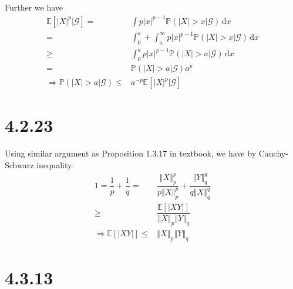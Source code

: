 \documentclass[11pt,a4paper]{ctexart}
\numberwithin{equation}{section}%
\begin{document}
\subsection{}
Further we have
\begin{align*}
    \mathbb{E}\left[ \left\vert X \right\vert ^p | \mathcal{G} \right]  =&\int p\left\vert x \right\vert ^{p-1} \mathbb{P}\left( \left\vert X \right\vert >x|\mathcal{G} \right) \,\mathrm{d}x\\
    =& \int_0^a +\int_a^\infty p\left\vert x \right\vert ^{p-1} \mathbb{P}\left( \left\vert X \right\vert >x|\mathcal{G} \right) \,\mathrm{d}x\\
    \geq & \int_0^a p\left\vert x \right\vert ^{p-1} \mathbb{P}\left( \left\vert X \right\vert >a|\mathcal{G} \right) \,\mathrm{d}x\\
    =& \mathbb{P}\left( \left\vert X \right\vert >a|\mathcal{G} \right) a^{p}\\
     \Rightarrow \mathbb{P}\left( \left\vert X \right\vert >a|\mathcal{G} \right) \leq& a^{-p}\mathbb{E}\left[ \left\vert X \right\vert ^p | \mathcal{G} \right]
\end{align*}



\section{4.2.23}

Using similar argument as Proposition 1.3.17 in textbook, we have by Cauchy-Schwarz inequality:
\begin{align*}
     1=\dfrac{ 1 }{ p }+\dfrac{ 1 }{ q }=& \dfrac{ \left\Vert X \right\Vert _p ^p }{ p\left\Vert X \right\Vert _p ^p } + \dfrac{ \left\Vert Y \right\Vert _q ^q }{ q\left\Vert X \right\Vert _q ^q }\\
     \geq & \dfrac{ \mathbb{E}\left[ \left\vert XY \right\vert  \right]  }{ \left\Vert X \right\Vert _p \left\Vert Y \right\Vert _q }\\
      \Rightarrow \mathbb{E}\left[ \left\vert XY \right\vert  \right]  \leq& \left\Vert X \right\Vert _p \left\Vert Y \right\Vert _q   
\end{align*}

\section{4.3.13}
\end{document}
